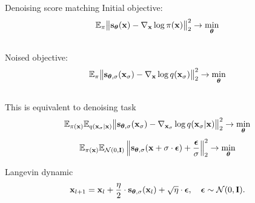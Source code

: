 \begin{frame}{Denoising score matching}
	Initial objective:
	\vspace{-0.2cm}
	\[
		\mathbb{E}_{\pi}\bigl\| \mathbf{s}_{\boldsymbol{\theta}}(\mathbf{x}) - \nabla_{\mathbf{x}} \log \pi(\mathbf{x}) \bigr\|^2_2 \rightarrow \min_{\boldsymbol{\theta}}
	\]
	\vspace{-0.5cm} \\
	Noised objective:
	\vspace{-0.2cm}
	\[
		\mathbb{E}_{\pi}\bigl\| \mathbf{s}_{\boldsymbol{\theta}, \sigma}(\mathbf{x}_\sigma) - \nabla_{\mathbf{x}} \log q(\mathbf{x}_{\sigma}) \bigr\|^2_2 \rightarrow \min_{\boldsymbol{\theta}}
	\]
	\vspace{-0.5cm} \\
	This is equivalent to denoising task
	\vspace{-0.2cm}
	\[
		\mathbb{E}_{\pi(\mathbf{x})} \mathbb{E}_{q(\mathbf{x}_{\sigma} | \mathbf{x})}\bigl\| \mathbf{s}_{\boldsymbol{\theta}, \sigma}(\mathbf{x}_{\sigma}) - \nabla_{\mathbf{x}_{\sigma}} \log q(\mathbf{x}_{\sigma} | \mathbf{x}) \bigr\|^2_2 \rightarrow \min_{\boldsymbol{\theta}}
	\]
	\vspace{-0.3cm}
	\[
		\mathbb{E}_{\pi(\mathbf{x})} \mathbb{E}_{\mathcal{N}(0, \mathbf{I})}\left\| \mathbf{s}_{\boldsymbol{\theta}, \sigma}(\mathbf{x} + \sigma \cdot \boldsymbol{\epsilon}) + \frac{\boldsymbol{\epsilon}}{\sigma} \right\|^2_2 \rightarrow \min_{\boldsymbol{\theta}}
	\]
	\vspace{-0.5cm}
	\begin{block}{Langevin dynamic}
		\vspace{-0.3cm}
		\[
			\mathbf{x}_{l + 1} = \mathbf{x}_l + \frac{\eta}{2} \cdot \mathbf{s}_{\boldsymbol{\theta}, \sigma}(\mathbf{x}_l) + \sqrt{\eta} \cdot \boldsymbol{\epsilon}, \quad \boldsymbol{\epsilon} \sim \mathcal{N}(0, \mathbf{I}).
		\]
		\vspace{-0.7cm}
	\end{block}
\end{frame}
